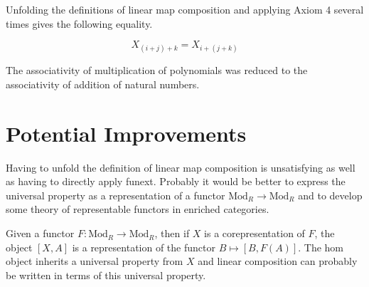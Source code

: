 \documentclass[12pt]{article} %
\theoremstyle{definition}
\theoremstyle{definition}
\theoremstyle{definition}
\theoremstyle{definition}
\begin{document}
Unfolding the definitions of linear map composition and applying Axiom 4 several times gives
the following equality.

\begin{equation}
  X_{(i + j) + k} = X_{i + (j + k)}
\end{equation}

The associativity of multiplication of polynomials was reduced to the associativity of addition
of natural numbers.

\section{Potential Improvements}

Having to unfold the definition of linear map composition is unsatisfying as well as having to 
directly apply funext. Probably it would be better to express the universal property as 
a representation of a functor $\text{Mod}_R \to \text{Mod}_R$ and to develop some
theory of representable functors in enriched categories.

Given a functor $F : \text{Mod}_R \to \text{Mod}_R$, then if $X$ is a corepresentation of $F$,
the object $[X, A]$ is a representation of the functor $B \mapsto [B, F(A)]$. The hom object 
inherits a universal property from $X$ and linear composition can probably be written in terms of this 
universal property.









\end{document}

